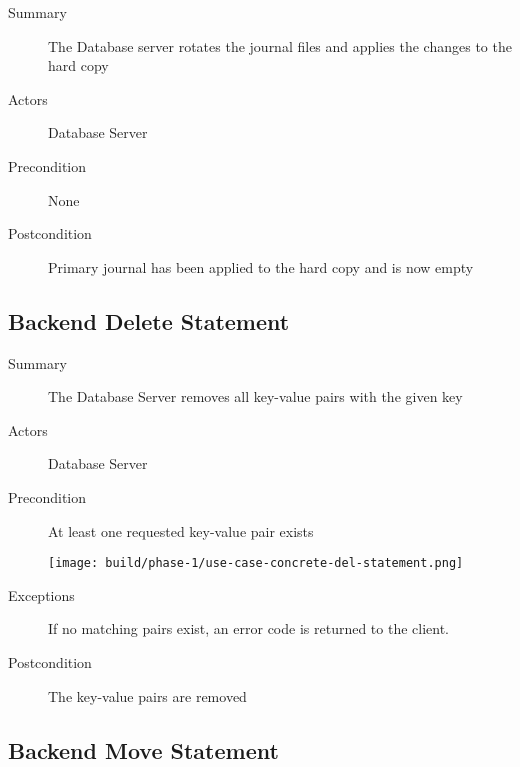 \documentclass[a4paper]{report}
\begin{document}
	\begin{description}
		\item[Summary] The Database server rotates the journal files and applies the changes to the hard copy
		\item[Actors] Database Server
		\item[Precondition] None

		\begin{center}
		\end{center}

		\item[Postcondition] Primary journal has been applied to the hard copy and is now empty
	\end{description}

	\pagebreak
	
	\subsection{Backend Delete Statement}

	\begin{description}
		\item[Summary] The Database Server removes all key-value pairs with the given key
		\item[Actors] Database Server
		\item[Precondition] At least one requested key-value pair exists

		\begin{center}
			\texttt{[image: build/phase-1/use-case-concrete-del-statement.png]}
		\end{center}

		\item[Exceptions] If no matching pairs exist, an error code is returned to the client.
		\item[Postcondition] The key-value pairs are removed
	\end{description}
	
	\pagebreak

	\subsection{Backend Move Statement}
\end{document}
